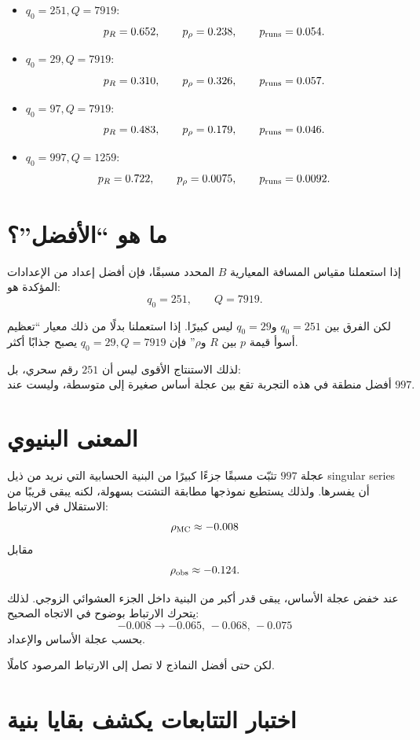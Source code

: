 \documentclass[12pt]{article}
\begin{document}
\begin{itemize}
\item \(q_0=251,Q=7919\):
\[
p_R=0.652,\qquad p_\rho=0.238,\qquad p_{\rm runs}=0.054.
\]

\item \(q_0=29,Q=7919\):
\[
p_R=0.310,\qquad p_\rho=0.326,\qquad p_{\rm runs}=0.057.
\]

\item \(q_0=97,Q=7919\):
\[
p_R=0.483,\qquad p_\rho=0.179,\qquad p_{\rm runs}=0.046.
\]

\item \(q_0=997,Q=1259\):
\[
p_R=0.722,\qquad p_\rho=0.0075,\qquad p_{\rm runs}=0.0092.
\]
\end{itemize}

\section{ما هو ``الأفضل''؟}

إذا استعملنا مقياس المسافة المعيارية \(B\) المحدد مسبقًا، فإن أفضل إعداد
من الإعدادات المؤكدة هو:
\[
\boxed{q_0=251,\qquad Q=7919.}
\]

لكن الفرق بين \(q_0=251\) و\(q_0=29\) ليس كبيرًا.
إذا استعملنا بدلًا من ذلك معيار ``تعظيم أسوأ قيمة \(p\) بين \(R\) و\(\rho\)''
فإن \(q_0=29,Q=7919\) يصبح جذابًا أكثر.

لذلك الاستنتاج الأقوى ليس أن \(251\) رقم سحري، بل:
\[
\boxed{\text{أفضل منطقة في هذه التجربة تقع بين عجلة أساس صغيرة إلى متوسطة، وليست عند }997.}
\]

\section{المعنى البنيوي}

عجلة \(997\) تثبّت مسبقًا جزءًا كبيرًا من البنية الحسابية التي نريد من
ذيل singular series أن يفسرها. ولذلك يستطيع نموذجها مطابقة التشتت بسهولة،
لكنه يبقى قريبًا من الاستقلال في الارتباط:
\[
\rho_{\rm MC}\approx -0.008
\]
مقابل
\[
\rho_{\rm obs}\approx -0.124.
\]

عند خفض عجلة الأساس، يبقى قدر أكبر من البنية داخل الجزء العشوائي الزوجي.
لذلك يتحرك الارتباط بوضوح في الاتجاه الصحيح:
\[
-0.008\longrightarrow -0.065,\,-0.068,\,-0.075
\]
بحسب عجلة الأساس والإعداد.

لكن حتى أفضل النماذج لا تصل إلى الارتباط المرصود كاملًا.

\section{اختبار التتابعات يكشف بقايا بنية}
\end{document}
